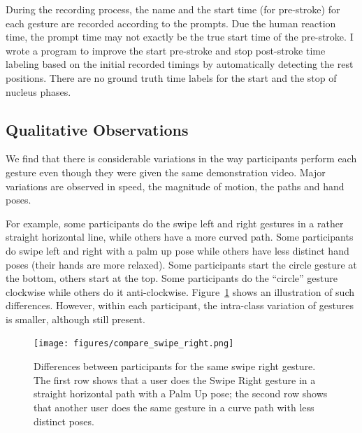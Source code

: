 During the recording process, the name and the start time (for pre-stroke) for
each gesture are recorded according to the prompts. Due the human reaction time,
the prompt time may not exactly be the true start time of the pre-stroke. I wrote a program to improve the
start pre-stroke and stop post-stroke time labeling based on the initial
recorded timings by automatically detecting the rest positions. There are no
ground truth time labels for the start and the stop of nucleus phases.

\subsection{Qualitative Observations}\label{sec:qualitative-observation}
We find that there is considerable variations in the way participants perform
each gesture even though they were given the same demonstration video. Major
variations are observed in speed, the magnitude of motion, the paths and hand poses.

For example, some participants do the swipe left and right gestures in a rather
straight horizontal line, while others have a more curved path.  Some
participants do swipe left and right with a palm up pose while others have
less distinct hand poses (their hands are more relaxed). Some participants start
the circle gesture at the bottom, others start at the top. Some
participants do the ``circle'' gesture clockwise while others do it
anti-clockwise. Figure~\ref{fig:compare-swipe-right} shows
an illustration of such differences. However, within each participant, the
intra-class variation of gestures is smaller, although still present.

\begin{figure}[tbh]
\centering
\texttt{[image: figures/compare\_swipe\_right.png]}
\caption{Differences between participants for the same swipe right gesture. 
The first row shows that a user does the Swipe Right gesture in a straight
horizontal path with a Palm Up pose; the second row shows that another user
does the same gesture in a curve path with less distinct poses.}
\label{fig:compare-swipe-right}
\end{figure}

